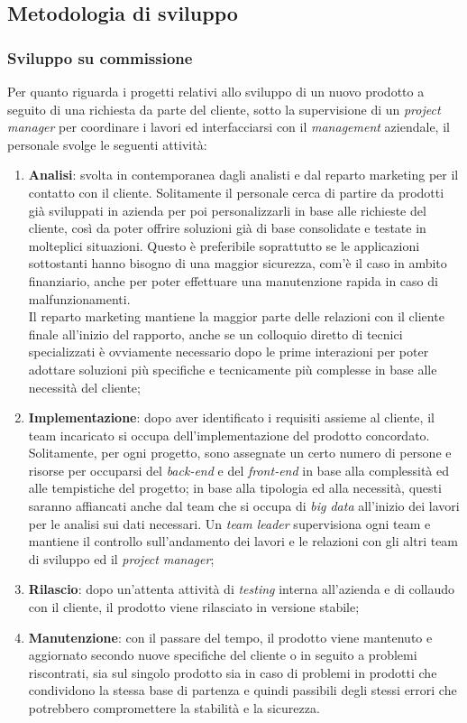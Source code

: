 \subsection{Metodologia di sviluppo}

\subsubsection{Sviluppo su commissione} \label{commissione}
Per quanto riguarda i progetti relativi allo sviluppo di un nuovo prodotto a seguito di una richiesta da parte del cliente, sotto la supervisione di un \textit{project manager} per coordinare i lavori ed interfacciarsi con il \textit{management} aziendale, il personale svolge le seguenti attività:
\begin{enumerate}
	\item \textbf{Analisi}: svolta in contemporanea dagli analisti e dal reparto marketing per il contatto con il cliente. Solitamente il personale cerca di partire da prodotti già sviluppati in azienda per poi personalizzarli in base alle richieste del cliente, così da poter offrire soluzioni già di base consolidate e testate in molteplici situazioni. Questo è preferibile soprattutto se le applicazioni sottostanti hanno bisogno di una maggior sicurezza, com'è il caso in ambito finanziario, anche per poter effettuare una manutenzione rapida in caso di malfunzionamenti.\\
	Il reparto marketing mantiene la maggior parte delle relazioni con il cliente finale all'inizio del rapporto, anche se un colloquio diretto di tecnici specializzati è ovviamente necessario dopo le prime interazioni per poter adottare soluzioni più specifiche e tecnicamente più complesse in base alle necessità del cliente;
	\item \textbf{Implementazione}: dopo aver identificato i requisiti assieme al cliente, il team incaricato si occupa dell'implementazione del prodotto concordato. Solitamente, per ogni progetto, sono assegnate un certo numero di persone e risorse per occuparsi del \textit{back-end} e del \textit{front-end} in base alla complessità ed alle tempistiche del progetto; in base alla tipologia ed alla necessità, questi saranno affiancati anche dal team che si occupa di \textit{big data} all'inizio dei lavori per le analisi sui dati necessari. Un \textit{team leader} supervisiona ogni team e mantiene il controllo sull'andamento dei lavori e le relazioni con gli altri team di sviluppo ed il \textit{project manager};
	\item \textbf{Rilascio}: dopo un'attenta attività di \textit{testing} interna all'azienda e di collaudo con il cliente, il prodotto viene rilasciato in versione stabile;
	\item \textbf{Manutenzione}: con il passare del tempo, il prodotto viene mantenuto e aggiornato secondo nuove specifiche del cliente o in seguito a problemi riscontrati, sia sul singolo prodotto sia in caso di problemi in prodotti che condividono la stessa base di partenza e quindi passibili degli stessi errori che potrebbero compromettere la stabilità e la sicurezza.
\end{enumerate}

